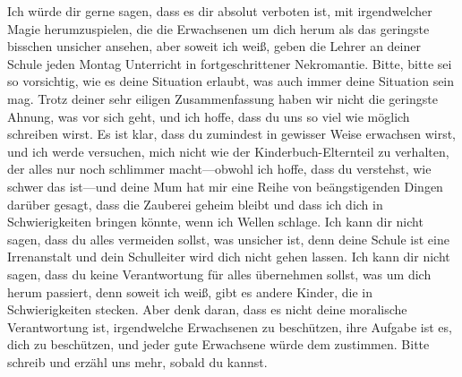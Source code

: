 \begin{writtenNote}
Ich würde dir gerne sagen, dass es dir absolut verboten ist, mit irgendwelcher Magie herumzuspielen, die die Erwachsenen um dich herum als das geringste bisschen unsicher ansehen, aber soweit ich weiß, geben die Lehrer an deiner Schule jeden Montag Unterricht in fortgeschrittener Nekromantie. Bitte, bitte sei so vorsichtig, wie es deine Situation erlaubt, was auch immer deine Situation sein mag. Trotz deiner sehr eiligen Zusammenfassung haben wir nicht die geringste Ahnung, was vor sich geht, und ich hoffe, dass du uns so viel wie möglich schreiben wirst. Es ist klar, dass du zumindest in gewisser Weise erwachsen wirst, und ich werde versuchen, mich nicht wie der Kinderbuch-Elternteil zu verhalten, der alles nur noch schlimmer macht—obwohl ich hoffe, dass du verstehst, wie schwer das ist—und deine Mum hat mir eine Reihe von beängstigenden Dingen darüber gesagt, dass die Zauberei geheim bleibt und dass ich dich in Schwierigkeiten bringen könnte, wenn ich Wellen schlage.
Ich kann dir nicht sagen, dass du alles vermeiden sollst, was unsicher ist, denn deine Schule ist eine Irrenanstalt und dein Schulleiter wird dich nicht gehen lassen. Ich kann dir nicht sagen, dass du keine Verantwortung für alles übernehmen sollst, was um dich herum passiert, denn soweit ich weiß, gibt es andere Kinder, die in Schwierigkeiten
stecken. Aber denk daran, dass es nicht deine moralische Verantwortung ist, irgendwelche Erwachsenen zu beschützen, ihre Aufgabe ist es, dich zu beschützen, und jeder gute Erwachsene würde dem zustimmen. Bitte schreib und erzähl uns mehr, sobald du kannst.


\end{writtenNote}
